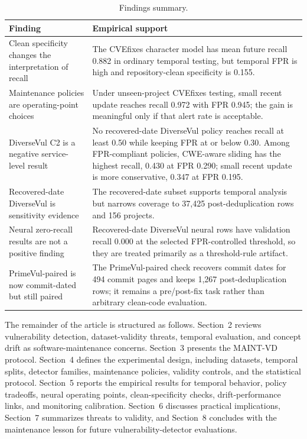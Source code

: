 \documentclass[a4paper,fleqn]{cas-dc}
\begin{document}
\begin{table}
\centering
\caption{Findings summary.}
\label{tab:intro-findings}
\small
\begin{tabular}{p{}p{}}
\toprule
Finding & Empirical support \\
\midrule
Clean specificity changes the interpretation of recall &
The CVEfixes character model has mean future recall 0.882 in ordinary temporal
testing, but temporal FPR is high and repository-clean specificity is 0.155. \\
Maintenance policies are operating-point choices &
Under unseen-project CVEfixes testing, small recent update reaches recall 0.972
with FPR 0.945; the gain is meaningful only if that alert rate is acceptable. \\
DiverseVul C2 is a negative service-level result &
No recovered-date DiverseVul policy reaches recall at least 0.50 while keeping
FPR at or below 0.30. Among FPR-compliant policies, CWE-aware sliding has the
highest recall, 0.430 at FPR 0.290; small recent update is more conservative,
0.347 at FPR 0.195. \\
Recovered-date DiverseVul is sensitivity evidence &
The recovered-date subset supports temporal analysis but narrows coverage to
37,425 post-deduplication rows and 156 projects. \\
Neural zero-recall results are not a positive finding &
Recovered-date DiverseVul neural rows have validation recall 0.000 at the
selected FPR-controlled threshold, so they are treated primarily as a
threshold-rule artifact. \\
PrimeVul-paired is now commit-dated but still paired &
The PrimeVul-paired check recovers commit dates for 494 commit pages and keeps
1,267 post-deduplication rows; it remains a pre/post-fix task rather than
arbitrary clean-code evaluation. \\
\bottomrule
\end{tabular}
\end{table}

The remainder of the article is structured as follows. Section~2 reviews
vulnerability detection, dataset-validity threats, temporal evaluation, and
concept drift as software-maintenance concerns. Section~3 presents the
MAINT-VD protocol. Section~4 defines the experimental design, including
datasets, temporal splits, detector families, maintenance policies, validity
controls, and the statistical protocol. Section~5 reports the empirical results
for temporal behavior, policy tradeoffs, neural operating points,
clean-specificity checks, drift-performance links, and monitoring calibration.
Section~6 discusses practical implications, Section~7 summarizes threats to
validity, and Section~8 concludes with the maintenance lesson for future
vulnerability-detector evaluations.
\end{document}

